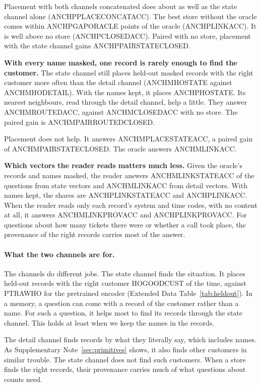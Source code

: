 \documentclass[11pt]{article}
\begin{document}
Placement with both channels concatenated does about as well as the state channel alone (ANCHPPLACECONCATACC). The best store without the oracle comes within ANCHPGAPORACLE points of the oracle (ANCHPLINKACC). It is well above no store (ANCHPCLOSEDACC). Paired with no store, placement with the state channel gains ANCHPPAIRSTATECLOSED.

\textbf{With every name masked, one record is rarely enough to find the customer.} The state channel still places held-out masked records with the right customer more often than the detail channel (ANCHMHOSTATE against ANCHMHODETAIL). With the names kept, it places ANCHPHOSTATE. Its nearest neighbours, read through the detail channel, help a little. They answer ANCHMROUTEDACC, against ANCHMCLOSEDACC with no store. The paired gain is ANCHMPAIRROUTEDCLOSED.

Placement does not help. It answers ANCHMPLACESTATEACC, a paired gain of ANCHMPAIRSTATECLOSED. The oracle answers ANCHMLINKACC.

\textbf{Which vectors the reader reads matters much less.} Given the oracle's records and names masked, the reader answers ANCHMLINKSTATEACC of the questions from state vectors and ANCHMLINKACC from detail vectors. With names kept, the shares are ANCHPLINKSTATEACC and ANCHPLINKACC. When the reader reads only each record's system and time codes, with no content at all, it answers ANCHMLINKPROVACC and ANCHPLINKPROVACC. For questions about how many tickets there were or whether a call took place, the provenance of the right records carries most of the answer.

\paragraph{What the two channels are for.} The channels do different jobs. The state channel finds the situation. It places held-out records with the right customer HOGOODCUST of the time, against PTRAWHO for the pretrained encoder (Extended Data Table~\ref{tab:heldout}). In a memory, a question can come with a record of the customer rather than a name. For such a question, it helps most to find its records through the state channel. This holds at least when we keep the names in the records.

The detail channel finds records by what they literally say, which includes names. As Supplementary Note~\ref{sec:primitives} shows, it also finds other customers in similar trouble. The state channel does not find such customers. When a store finds the right records, their provenance carries much of what questions about counts need.
\end{document}

